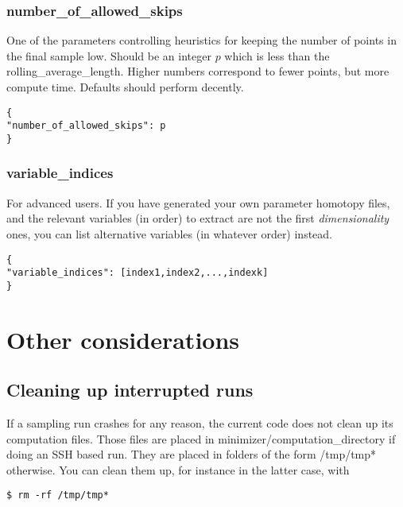 \documentclass[11pt]{article}
\begin{document}
\subsubsection{number\_of\_allowed\_skips}
One of the parameters controlling heuristics for keeping the number of points in the final sample low. Should be an integer $p$ which is less than the rolling\_average\_length. Higher numbers correspond to fewer points, but more compute time. Defaults should perform decently.

\begin{verbatim}
{ 
"number_of_allowed_skips": p
}
\end{verbatim} 

\subsubsection{variable\_indices}
For advanced users. If you have generated your own parameter homotopy files, and the relevant variables (in order) to extract are not the first \emph{dimensionality} ones, you can list alternative variables (in whatever order) instead. 

\begin{verbatim}
{ 
"variable_indices": [index1,index2,...,indexk]
}
\end{verbatim} 

\section{Other considerations} 

\subsection{Cleaning up interrupted runs}
If a sampling run crashes for any reason, the current code does not clean up its computation files. Those files are placed in minimizer/computation\_directory if doing an SSH based run. They are placed in folders of the form /tmp/tmp* otherwise. You can clean them up, for instance in the latter case, with

\begin{verbatim} 
$ rm -rf /tmp/tmp*
\end{verbatim}  
\end{document}
